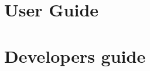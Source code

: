 \documentclass[10pt,letter, twopage headsepline]{book}
\begin{document}


\part{User Guide}
  
  
  
  


\part{Developers guide}
  
\end{document}
